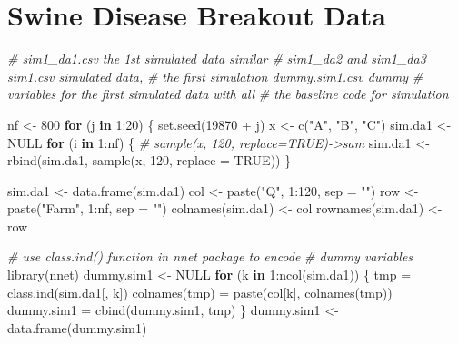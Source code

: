 \documentclass[
  12pt,
]{krantz}
\makeatletter
\newenvironment{Shaded}{\begin{snugshade}}{\end{snugshade}}
\newcommand{\AttributeTok}[1]{\textcolor[rgb]{0.61,0.61,0.61}{#1}}
\newcommand{\CommentTok}[1]{\textcolor[rgb]{0.37,0.37,0.37}{\textit{#1}}}
\newcommand{\ConstantTok}[1]{\textcolor[rgb]{0,0,0}{#1}}
\newcommand{\ControlFlowTok}[1]{\textcolor[rgb]{0.27,0.27,0.27}{\textbf{#1}}}
\newcommand{\DecValTok}[1]{\textcolor[rgb]{0.06,0.06,0.06}{#1}}
\newcommand{\FunctionTok}[1]{\textcolor[rgb]{0,0,0}{#1}}
\newcommand{\NormalTok}[1]{#1}
\newcommand{\OtherTok}[1]{\textcolor[rgb]{0.37,0.37,0.37}{#1}}
\newcommand{\SpecialCharTok}[1]{\textcolor[rgb]{0,0,0}{#1}}
\newcommand{\StringTok}[1]{\textcolor[rgb]{0.5,0.5,0.5}{#1}}
\newenvironment{kframe}{%
\medskip{}
\setlength{\fboxsep}{.8em}
 \def\at@end@of@kframe{}%
 \ifinner\ifhmode%
  \def\at@end@of@kframe{\end{minipage}}%
  \begin{minipage}{\columnwidth}%
 \fi\fi%
 \def\FrameCommand##1{\hskip\@totalleftmargin \hskip-\fboxsep
 \colorbox{shadecolor}{##1}\hskip-\fboxsep
     \hskip-\linewidth \hskip-\@totalleftmargin \hskip\columnwidth}%
 \MakeFramed {\advance\hsize-\width
   \@totalleftmargin\z@ \linewidth\hsize
   \@setminipage}}%
 {\par\unskip\endMakeFramed%
 \at@end@of@kframe}
\renewenvironment{Shaded}{\begin{kframe}}{\end{kframe}}
\makeatother
\begin{document}
\hypertarget{appendixdata3}{%
\section{Swine Disease Breakout Data}\label{appendixdata3}}

\begin{Shaded}
\begin{Highlighting}[]
\CommentTok{\# sim1\_da1.csv the 1st simulated data similar}
\CommentTok{\# sim1\_da2 and sim1\_da3 sim1.csv simulated data,}
\CommentTok{\# the first simulation dummy.sim1.csv dummy}
\CommentTok{\# variables for the first simulated data with all}
\CommentTok{\# the baseline code for simulation}

\NormalTok{nf }\OtherTok{\textless{}{-}} \DecValTok{800}
\ControlFlowTok{for}\NormalTok{ (j }\ControlFlowTok{in} \DecValTok{1}\SpecialCharTok{:}\DecValTok{20}\NormalTok{) \{}
    \FunctionTok{set.seed}\NormalTok{(}\DecValTok{19870} \SpecialCharTok{+}\NormalTok{ j)}
\NormalTok{    x }\OtherTok{\textless{}{-}} \FunctionTok{c}\NormalTok{(}\StringTok{"A"}\NormalTok{, }\StringTok{"B"}\NormalTok{, }\StringTok{"C"}\NormalTok{)}
\NormalTok{    sim.da1 }\OtherTok{\textless{}{-}} \ConstantTok{NULL}
    \ControlFlowTok{for}\NormalTok{ (i }\ControlFlowTok{in} \DecValTok{1}\SpecialCharTok{:}\NormalTok{nf) \{}
        \CommentTok{\# sample(x, 120, replace=TRUE){-}\textgreater{}sam}
\NormalTok{        sim.da1 }\OtherTok{\textless{}{-}} \FunctionTok{rbind}\NormalTok{(sim.da1, }\FunctionTok{sample}\NormalTok{(x, }\DecValTok{120}\NormalTok{, }\AttributeTok{replace =} \ConstantTok{TRUE}\NormalTok{))}
\NormalTok{    \}}
    
\NormalTok{    sim.da1 }\OtherTok{\textless{}{-}} \FunctionTok{data.frame}\NormalTok{(sim.da1)}
\NormalTok{    col }\OtherTok{\textless{}{-}} \FunctionTok{paste}\NormalTok{(}\StringTok{"Q"}\NormalTok{, }\DecValTok{1}\SpecialCharTok{:}\DecValTok{120}\NormalTok{, }\AttributeTok{sep =} \StringTok{""}\NormalTok{)}
\NormalTok{    row }\OtherTok{\textless{}{-}} \FunctionTok{paste}\NormalTok{(}\StringTok{"Farm"}\NormalTok{, }\DecValTok{1}\SpecialCharTok{:}\NormalTok{nf, }\AttributeTok{sep =} \StringTok{""}\NormalTok{)}
    \FunctionTok{colnames}\NormalTok{(sim.da1) }\OtherTok{\textless{}{-}}\NormalTok{ col}
    \FunctionTok{rownames}\NormalTok{(sim.da1) }\OtherTok{\textless{}{-}}\NormalTok{ row}
    
    \CommentTok{\# use class.ind() function in nnet package to encode}
    \CommentTok{\# dummy variables}
    \FunctionTok{library}\NormalTok{(nnet)}
\NormalTok{    dummy.sim1 }\OtherTok{\textless{}{-}} \ConstantTok{NULL}
    \ControlFlowTok{for}\NormalTok{ (k }\ControlFlowTok{in} \DecValTok{1}\SpecialCharTok{:}\FunctionTok{ncol}\NormalTok{(sim.da1)) \{}
\NormalTok{        tmp }\OtherTok{=} \FunctionTok{class.ind}\NormalTok{(sim.da1[, k])}
        \FunctionTok{colnames}\NormalTok{(tmp) }\OtherTok{=} \FunctionTok{paste}\NormalTok{(col[k], }\FunctionTok{colnames}\NormalTok{(tmp))}
\NormalTok{        dummy.sim1 }\OtherTok{=} \FunctionTok{cbind}\NormalTok{(dummy.sim1, tmp)}
\NormalTok{    \}}
\NormalTok{    dummy.sim1 }\OtherTok{\textless{}{-}} \FunctionTok{data.frame}\NormalTok{(dummy.sim1)}
    

\end{Highlighting}
\end{Shaded}
\end{document}
